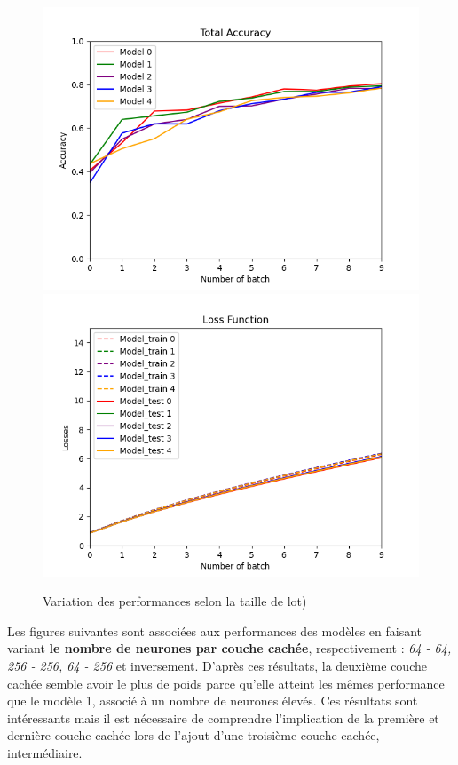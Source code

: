 \documentclass[a4paper]{article}
\begin{document}
		\begin{figure}[!ht]
			\centering
			\includegraphics[width=.5\textwidth]{Fig_acc_p3_batchsize.png}\hfill
			\includegraphics[width=.5\textwidth]{Fig_losses_p3_batchsize.png}\hfill
			\caption{Variation des performances selon la taille de lot)}	
		\end{figure}

	\newpage
	Les figures suivantes sont associées aux performances des modèles en faisant variant \textbf{le nombre de neurones par couche cachée}, respectivement : \textit{64 - 64, 256 - 256, 64 - 256} et inversement. D'après ces résultats, la deuxième couche cachée semble avoir le plus de poids parce qu'elle atteint les mêmes performance que le modèle 1, associé à un nombre de neurones élevés. Ces résultats sont intéressants mais il est nécessaire de comprendre l'implication de la première et dernière couche cachée lors de l'ajout d'une troisième couche cachée, intermédiaire.
\end{document}
